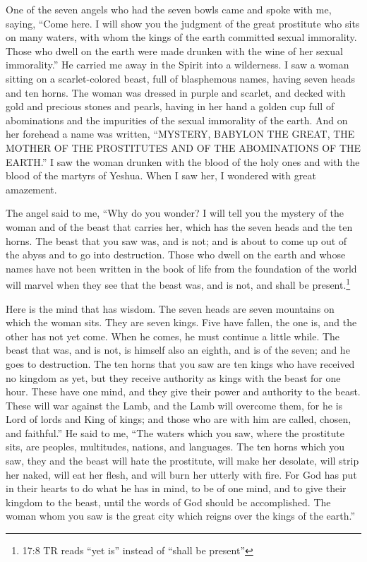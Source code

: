 \mychapter{} \myverse*{}One of the seven angels who had the seven bowls came and spoke
with me, saying, “Come here. I will show you the judgment of the great prostitute who sits on many waters,
\myverse{}with whom the kings of the earth committed sexual immorality. Those who dwell
on the earth were made drunken with the wine of her sexual immorality.”
\myverse{}He carried me away in the Spirit into a wilderness. I saw a woman sitting on
a scarlet-colored beast, full of blasphemous names, having seven heads and ten horns.
\myverse{}The woman was dressed in purple and scarlet, and decked with gold and precious
stones and pearls, having in her hand a golden cup full of abominations and the impurities of the sexual
immorality of the earth.
\myverse{}And on her forehead a name was written, “MYSTERY, BABYLON THE GREAT, THE MOTHER
OF THE PROSTITUTES AND OF THE ABOMINATIONS OF THE EARTH.”
\myverse{}I saw the woman drunken with the blood of the holy ones and with the blood
of the martyrs of Yeshua. When I saw her, I wondered with great amazement.

\myverse{}The angel said to me, “Why do you wonder? I will tell you the
mystery of the woman and of the beast that carries her, which has the seven heads and the ten horns.
\myverse{}The beast that you saw was, and is not; and is about to come up out of the
abyss and to go into destruction. Those who dwell on the earth and whose names have not been written in
the book of life from the foundation of the world will marvel when they see that the beast was, and is
not, and shall be present.\footnote{17:8 TR reads “yet is” instead of “shall be present”}

\myverse{}Here is the mind that has wisdom. The seven heads are seven mountains
on which the woman sits.
\myverse{}They are seven kings. Five have fallen, the one is, and the other has not
yet come. When he comes, he must continue a little while.
\myverse{}The beast that was, and is not, is himself also an eighth, and is of the
seven; and he goes to destruction.
\myverse{}The ten horns that you saw are ten kings who have received no kingdom as
yet, but they receive authority as kings with the beast for one hour.
\myverse{}These have one mind, and they give their power and authority to the beast.
\myverse{}These will war against the Lamb, and the Lamb will overcome them, for he
is Lord of lords and King of kings; and those who are with him are called, chosen, and faithful.”
\myverse{}He said to me, “The waters which you saw, where the prostitute sits, are
peoples, multitudes, nations, and languages.
\myverse{}The ten horns which you saw, they and the beast will hate the prostitute,
will make her desolate, will strip her naked, will eat her flesh, and will burn her utterly with fire.
\myverse{}For God has put in their hearts to do what he has in mind, to be of one mind,
and to give their kingdom to the beast, until the words of God should be accomplished.
\myverse{}The woman whom you saw is the great city which reigns over the kings of the
earth.”



